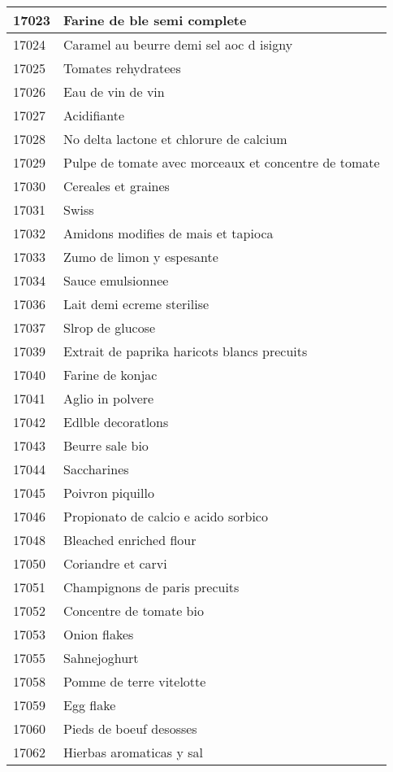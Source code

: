 \begin{longtable}{|l|l|}
17023 & Farine de ble semi complete \\ \hline 
17024 & Caramel au beurre demi sel aoc d isigny \\ \hline 
17025 & Tomates rehydratees \\ \hline 
17026 & Eau de vin de vin \\ \hline 
17027 & Acidifiante \\ \hline 
17028 & No delta lactone et chlorure de calcium \\ \hline 
17029 & Pulpe de tomate avec morceaux et concentre de tomate \\ \hline 
17030 & Cereales et graines \\ \hline 
17031 & Swiss \\ \hline 
17032 & Amidons modifies de mais et tapioca \\ \hline 
17033 & Zumo de limon y espesante \\ \hline 
17034 & Sauce emulsionnee \\ \hline 
17036 & Lait demi ecreme sterilise \\ \hline 
17037 & Slrop de glucose \\ \hline 
17039 & Extrait de paprika haricots blancs precuits \\ \hline 
17040 & Farine de konjac \\ \hline 
17041 & Aglio in polvere \\ \hline 
17042 & Edlble decoratlons \\ \hline 
17043 & Beurre sale bio \\ \hline 
17044 & Saccharines \\ \hline 
17045 & Poivron piquillo \\ \hline 
17046 & Propionato de calcio e acido sorbico \\ \hline 
17048 & Bleached enriched flour \\ \hline 
17050 & Coriandre et carvi \\ \hline 
17051 & Champignons de paris precuits \\ \hline 
17052 & Concentre de tomate bio \\ \hline 
17053 & Onion flakes \\ \hline 
17055 & Sahnejoghurt \\ \hline 
17058 & Pomme de terre vitelotte \\ \hline 
17059 & Egg flake \\ \hline 
17060 & Pieds de boeuf desosses \\ \hline 
17062 & Hierbas aromaticas y sal \\ \hline 

\end{longtable}
